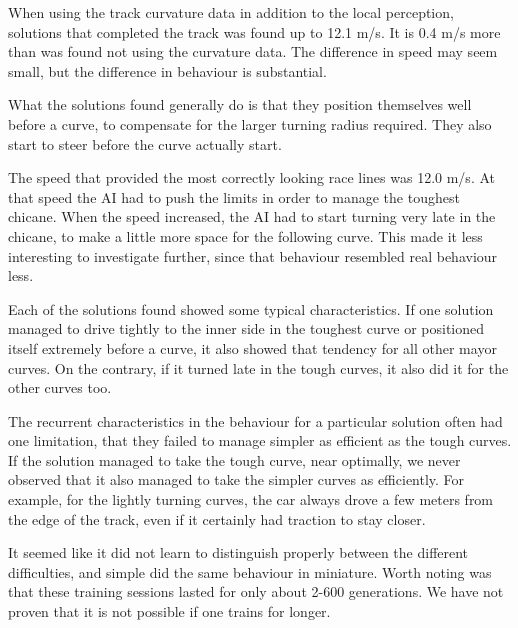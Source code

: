 

When using the track curvature data in addition to the local perception, solutions that completed the track was found up to 12.1 m/s. It is 0.4 m/s more than was found not using the curvature data. The difference in speed may seem small, but the difference in behaviour is substantial.

What the solutions found generally do is that they position themselves well before a curve, to compensate for the larger turning radius required. They also start to steer before the curve actually start.

The speed that provided the most correctly looking race lines was 12.0 m/s. At that speed the AI had to push the limits in order to manage the toughest chicane. When the speed increased, the AI had to start turning very late in the chicane, to make a little more space for the following curve. This made it less interesting to investigate further, since that behaviour resembled real behaviour less.

Each of the solutions found showed some typical characteristics. If one solution managed to drive tightly to the inner side in the toughest curve or positioned itself extremely before a curve, it also showed that tendency for all other mayor curves. On the contrary, if it turned late in the tough curves, it also did it for the other curves too.

The recurrent characteristics in the behaviour for a particular solution often had one limitation, that they failed to manage simpler as efficient as the tough curves. If the solution managed to take the tough curve, near optimally, we never observed that it also managed to take the simpler curves as efficiently. For example, for the lightly turning curves, the car always drove a few meters from the edge of the track, even if it certainly had traction to stay closer. 

It seemed like it did not learn to distinguish properly between the different difficulties, and simple did the same behaviour in miniature. Worth noting was that these training sessions lasted for only about 2-600 generations. We have not proven that it is not possible if one trains for longer.

